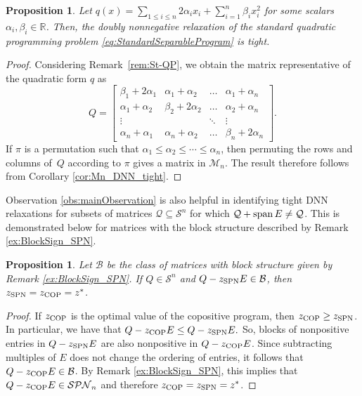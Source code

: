 \documentclass{amsart}
\def\spann{\mathop{\rm span}\nolimits}
\newcommand{\bbR}{\mathbb{R}}
\newcommand{\cB}{\mathcal{B}}
\newcommand{\cM}{\mathcal{M}}
\newcommand{\cS}{\mathcal{S}}
\newcommand{\cQ}{\mathcal{Q}}
\newcommand{\SPN}{\mathcal{SPN}}
\newtheorem{proposition}[theorem]{Proposition}
\theoremstyle{definition}
\begin{document}
\begin{proposition}\label{prop:SeparableDNNTight}
Let $q(x) = \sum_{1\leq i \leq n} 2\alpha_i x_i+ \sum_{i = 1}^{n}\beta_i x_i^2$ for some scalars $\alpha_{i},\beta_i \in \bbR$. Then, the doubly nonnegative relaxation of the standard quadratic programming problem \eqref{eq:StandardSeparableProgram} is tight. 
\end{proposition}

\begin{proof}
Considering Remark~\ref{rem:St-QP}, we obtain the matrix representative of the quadratic form $q$ as 
\[Q = \begin{bmatrix} \beta_1 + 2\alpha_1 & \alpha_1 + \alpha_2 & \dots & \alpha_1 + \alpha_n\\ \alpha_1 + \alpha_2 & \beta_2 + 2\alpha_2 & \dots & \alpha_2 + \alpha_n\\ \vdots & & \ddots & \vdots\\ \alpha_n + \alpha_1 & \alpha_n + \alpha_2 & \dots & \beta_n + 2\alpha_n\end{bmatrix}.\]
%
If $\pi$ is a permutation such that $\alpha_1\leq \alpha_2\leq \cdots \leq \alpha_n$, then permuting the rows and columns of~$Q$ according to $\pi$ gives a matrix in $\cM_n$. The result therefore follows from Corollary \ref{cor:Mn_DNN_tight}.
\end{proof}


Observation \ref{obs:mainObservation}  is also helpful in identifying tight DNN relaxations for subsets of matrices $\cQ \subseteq \cS^n$ for which $\cQ + \spann E \neq \cQ$. This is demonstrated below for matrices with the block structure described by Remark \ref{ex:BlockSign_SPN}. 

\begin{proposition}
Let $\cB$ be the class of matrices with block structure given by Remark \ref{ex:BlockSign_SPN}. If $Q\in \cS^n$ and $Q -z_{\textup{SPN}}E \in \cB$, then $z_{\textup{SPN}} = z_{\textup{COP}} = z^*$.  
\end{proposition}

\begin{proof}
If $z_{\textup{COP}}$ is the optimal value of the copositive program, then $z_{\textup{COP}} \geq z_{\textup{SPN}}$. In particular, we have that 
$Q-z_{\textup{COP}}E \leq Q-z_{\textup{SPN}}E.$
%
So, blocks of nonpositive entries in $Q-z_{\textup{SPN}}E$ are also nonpositive in $Q-z_{\textup{COP}}E$. Since subtracting multiples of $E$ does not change the ordering of entries, it follows that $Q-z_{\textup{COP}}E \in \cB$. By Remark \ref{ex:BlockSign_SPN}, this implies that $Q-z_{\textup{COP}}E \in \SPN_n$ and therefore $z_{\textup{COP}} = z_{\textup{SPN}} = z^*$. 
\end{proof}
\end{document}
